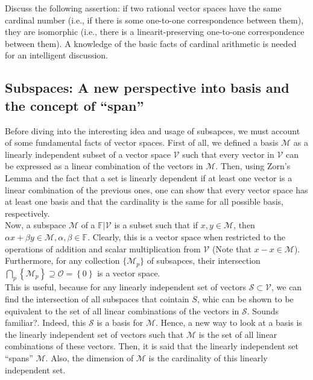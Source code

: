 \documentclass[12pt]{article}
\newenvironment{problem}[2][Problem]{\begin{trivlist} \item[\hskip \labelsep {\bfseries #1}\hskip \labelsep {\bfseries #2.}]}{\end{trivlist}}
\newenvironment{solution}[1][Solution]{\begin{trivlist} \item[\hskip \labelsep {\bfseries #1}]}{\end{trivlist}}
\begin{document}
\begin{problem}{4}
  Discuss the following assertion: if two rational vector spaces have the same cardinal number (i.e., if there is some one-to-one correspondence between them), they are isomorphic (i.e., there is a linearit-preserving one-to-one correspondence between them). A knowledge of the basic facts of cardinal arithmetic is needed for an intelligent discussion.
\begin{solution}
  
\end{solution}
\end{problem}

\subsection{Subspaces: A new perspective into basis and the concept of ``span''}

Before diving into the interesting idea and usage of subsapces, we must account of some fundamental facts of vector spaces. First of all, we defined a basis $\mathcal{M}$ as a linearly independent subset of a vector space $\mathcal{V}$ such that every vector in $\mathcal{V}$ can be expressed as a linear combination of the vectors in $\mathcal{M}$. Then, using Zorn's Lemma and the fact that a set is linearly dependent if at least one vector is a linear combination of the previous ones, one can show that every vector space has at least one basis and that the cardinality is the same for all possible basis, respectively.\\

Now, a subspace $\mathcal{M}$ of a $\mathbb{F}|\mathcal{V}$ is a subset such that if $x,y\in \mathcal{M}$, then $\alpha x+\beta y\in \mathcal{M}, \alpha,\beta\in \mathbb{F}$. Clearly, this is a vector space when restricted to the operations of addition and scalar multiplication from $\mathcal{V}$ (Note that $x-x\in \mathcal{M}$). Furthermore, for any collection $\{\mathcal{M}_{p}\}$ of subsapces, their intersection $\bigcap_{p}\left\{ \mathcal{M}_{p} \right\}\supseteq \mathcal{O}=\left\{ 0 \right\}$ is a vector space.\\

This is useful, because for any linearly independent set of vectors $\mathcal{S}\subset \mathcal{V}$, we can find the intersection of all subspaces that cointain $S$, whic can be shown to be equivalent to the set of all linear combinations of the vectors in $\mathcal{S}$. Sounds familiar?. Indeed, this $\mathcal{S}$ is a basis for $\mathcal{M}$. Hence, a new way to look at a basis is the linearly independent set of vectors such that $\mathcal{M}$ is the set of all linear combinations of these vectors. Then, it is said that the linearly independent set ``spans'' $\mathcal{M}$. Also, the dimension of $\mathcal{M}$ is the cardinality of this linearly independent set. 
\end{document}
